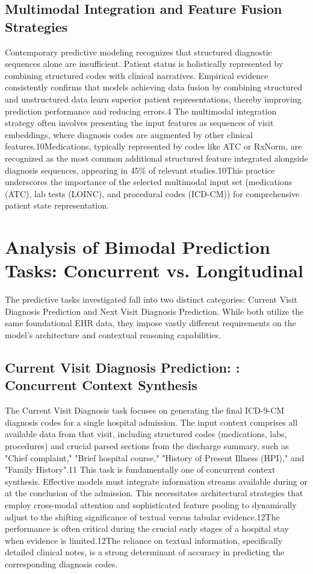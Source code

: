 \subsection{Multimodal Integration and Feature Fusion Strategies}
Contemporary predictive modeling recognizes that structured diagnostic sequences alone are insufficient. Patient status is holistically represented by combining structured codes with clinical narratives. Empirical evidence consistently confirms that models achieving data fusion by combining structured and unstructured data learn superior patient representations, thereby improving prediction performance and reducing errors.4
The multimodal integration strategy often involves presenting the input features as sequences of visit embeddings, where diagnosis codes are augmented by other clinical features.10Medications, typically represented by codes like ATC or RxNorm, are recognized as the most common additional structured feature integrated alongside diagnosis sequences, appearing in 45\% of relevant studies.10This practice underscores the importance of the selected multimodal input set (medications (ATC), lab tests (LOINC), and procedural codes (ICD-CM)) for comprehensive patient state representation.


\section{Analysis of Bimodal Prediction Tasks: Concurrent vs. Longitudinal}
The predictive tasks investigated fall into two distinct categories: Current Visit Diagnosis Prediction and Next Visit Diagnosis Prediction. While both utilize the same foundational EHR data, they impose vastly different requirements on the model's architecture and contextual reasoning capabilities.

\subsection{Current Visit Diagnosis Prediction: : Concurrent Context Synthesis}
The Current Visit Diagnosis task focuses on generating the final ICD-9-CM diagnosis codes for a single hospital admission. The input context comprises all available data from that visit, including structured codes (medications, labs, procedures) and crucial parsed sections from the discharge summary, such as "Chief complaint," "Brief hospital course," "History of Present Illness (HPI)," and "Family History".11
This task is fundamentally one of concurrent context synthesis. Effective models must integrate information streams available during or at the conclusion of the admission. This necessitates architectural strategies that employ cross-modal attention and sophisticated feature pooling to dynamically adjust to the shifting significance of textual versus tabular evidence.12The performance is often critical during the crucial early stages of a hospital stay when evidence is limited.12The reliance on textual information, specifically detailed clinical notes, is a strong determinant of accuracy in predicting the corresponding diagnosis codes.

